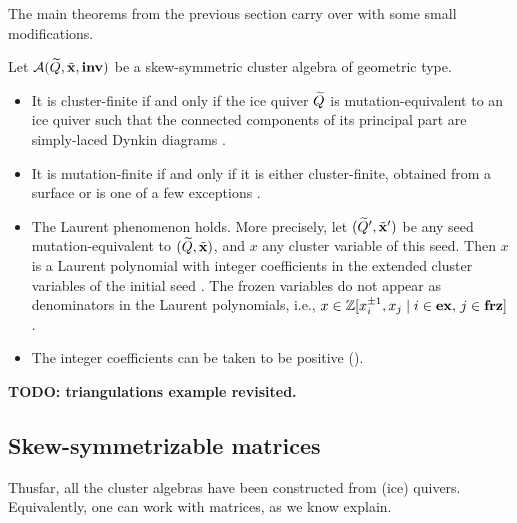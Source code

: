 The main theorems from the previous section carry over with some small modifications.
\begin{theorem}

	Let $\mathcal{A}(\widetilde{Q}, \tilde{\mathbf{x}}, \mathbf{inv})$ be a skew-symmetric cluster algebra of geometric type.
	\begin{itemize}
		\item It is cluster-finite if and only if the ice quiver $\widetilde{Q}$ is mutation-equivalent to an
		      ice quiver such that the connected components of its principal part are simply-laced
		      Dynkin diagrams \cite{FominZelevinsky2003CAFin}.
		\item It is mutation-finite if and only if it is either cluster-finite, obtained from a
		      surface or is one of a few exceptions \cite{FeliksonPavel2023cluster}.
		\item The Laurent phenomenon holds. More precisely, let $(\widetilde{Q}', \tilde{\mathbf{x}}')$ be any seed
		      mutation-equivalent to $(\widetilde{Q}, \tilde{\mathbf{x}})$, and $x$ any cluster variable of this seed. Then
		      $x$ is a Laurent polynomial with integer coefficients in the extended cluster variables
		      of the initial seed \cite{FominZelevinsky2002CAF}. The frozen variables do not appear
		      as denominators in the Laurent polynomials, i.e., $x \in \mathbb{Z}[x_i^{\pm 1}, x_j \mid i
			      \in \mathbf{ex},\, j \in \mathbf{frz}]$ \cite[Theorem 3.3.6]{FominWilliams2021IntroductionCA_1-3}.
		\item The integer coefficients can be taken to be positive
		      (\cite{LeeSchiffler2015PositivityCA}).
	\end{itemize}
\end{theorem}

\textbf{TODO: triangulations example revisited.}

\subsection{Skew-symmetrizable matrices}

Thusfar, all the cluster algebras have been constructed from (ice) quivers.
Equivalently, one can work with matrices, as we know explain.

